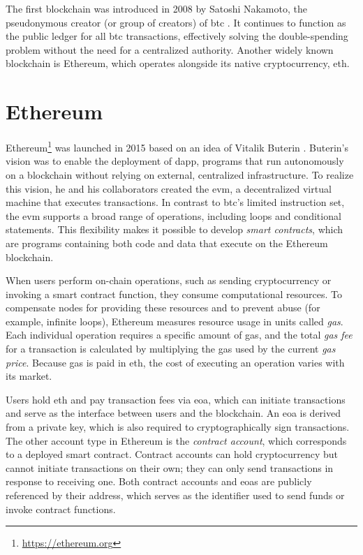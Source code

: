 The first blockchain was introduced in 2008 by Satoshi Nakamoto, the pseudonymous creator (or group of creators) of \gls{btc} \cite{nakamoto2008bitcoin}. It continues to function as the public ledger for all \gls{btc} transactions, effectively solving the \gls{double-spending} problem without the need for a centralized authority. Another widely known blockchain is Ethereum, which operates alongside its native cryptocurrency, \gls{eth}.

\section{Ethereum}
Ethereum\footnote{\url{https://ethereum.org}} was launched in 2015 based on an idea of Vitalik Buterin \cite{buterin2014next}\cite{wood2014ethereum}. Buterin's vision was to enable the deployment of \gls{dapp}, programs that run autonomously on a blockchain without relying on external, centralized infrastructure. To realize this vision, he and his collaborators created the \gls{evm}, a decentralized virtual machine that executes transactions. In contrast to \gls{btc}'s limited instruction set, the \gls{evm} supports a broad range of operations, including loops and conditional statements. This flexibility makes it possible to develop \textit{smart contracts}, which are programs containing both code and data that execute on the Ethereum blockchain.

When users perform on-chain operations, such as sending cryptocurrency or invoking a smart contract function, they consume computational resources. To compensate nodes for providing these resources and to prevent abuse (for example, infinite loops), Ethereum measures resource usage in units called \textit{gas}. Each individual operation requires a specific amount of gas, and the total \textit{gas fee} for a transaction is calculated by multiplying the gas used by the current \textit{gas price}. Because gas is paid in \gls{eth}, the cost of executing an operation varies with its market.

Users hold \gls{eth} and pay transaction fees via \gls{eoa}, which can initiate transactions and serve as the interface between users and the blockchain. An \gls{eoa} is derived from a private key, which is also required to cryptographically sign transactions. The other account type in Ethereum is the \textit{contract account}, which corresponds to a deployed smart contract. Contract accounts can hold cryptocurrency but cannot initiate transactions on their own; they can only send transactions in response to receiving one. Both contract accounts and \glspl{eoa} are publicly referenced by their address, which serves as the identifier used to send funds or invoke contract functions.

